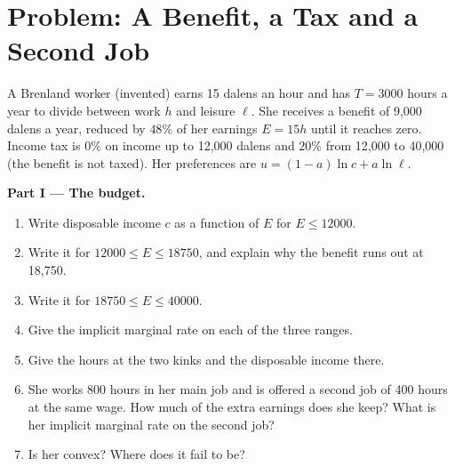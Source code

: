 \section{Problem: A Benefit, a Tax and a Second Job}\label{sec:b1:labour-supply-and-saving:problem}

\begin{problem}\label{pb:b1:labour-supply-and-saving:second-job}
A Brenland worker (invented) earns 15 dalens an hour and has $T = 3000$ hours
a year to divide between work $h$ and leisure $\ell$. She receives a benefit
of 9,000 dalens a year, reduced by $48\%$ of her earnings $E = 15h$ until it
reaches zero. Income tax is $0\%$ on income up to 12,000 dalens and $20\%$
from 12,000 to 40,000 (the benefit is not taxed). Her preferences are
$u = (1 - a)\ln c + a\ln\ell$.

\medskip\noindent\textbf{Part I --- The budget.}
\begin{enumerate}
  \item Write disposable income $c$ as a function of $E$ for $E \le 12000$.
  \item Write it for $12000 \le E \le 18750$, and explain why the benefit runs out at 18,750.
  \item Write it for $18750 \le E \le 40000$.
  \item Give the implicit marginal rate on each of the three ranges.
  \item Give the hours at the two kinks and the disposable income there.
  \item She works 800 hours in her main job and is offered a second job of 400 hours at the same wage. How much of the extra earnings does she keep? What is her implicit marginal rate on the second job?
  \item Is her  convex? Where does it fail to be?
\end{enumerate}


\end{problem}
